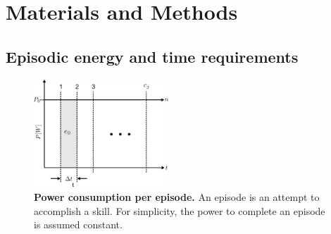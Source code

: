 \section{Materials and Methods}\label{sec:materials_and_methods}

\subsection{Episodic energy and time requirements}\label{sec:power_per_episode}
\begin{figure}[!h]
	\centering
	\includegraphics[width=0.45\textwidth]{fig/power_per_episode.png}
	\caption{\textbf{Power consumption per episode.} An episode is an attempt to accomplish a skill. For simplicity, the power to complete an episode is assumed constant.}	
	\label{fig:power_per_episode}
\end{figure}
